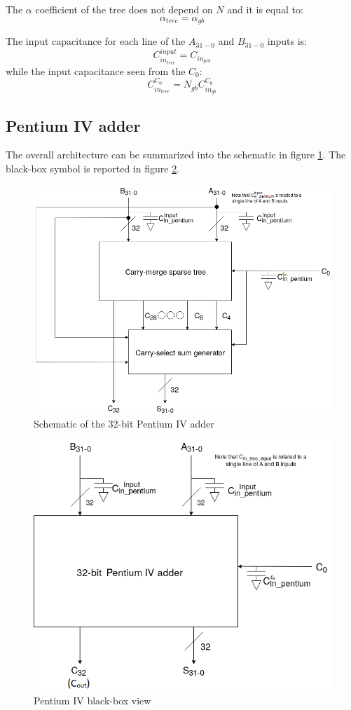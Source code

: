 The $\alpha$ coefficient of the tree does not depend on $N$ and it is equal to:
\begin{equation}
\alpha_{tree} = \alpha_{gb}
\end{equation}

The input capacitance for each line of the $A_{31-0}$ and $B_{31-0}$ inputs is:
\begin{equation}
C_{in_{tree}}^{input} = C_{in_{pcb}}
\end{equation}
while the input capacitance seen from the $C_0$:
\begin{equation}
C_{in_{tree}}^{C_0} = N_{gb}C_{in_{gb}}^{C_0}
\end{equation}





\subsection{Pentium IV adder}
The overall architecture can be summarized into the schematic in figure \ref{fig:pentium32adder_schematic}. The black-box symbol is reported in figure \ref{fig:pentium32adder_bb}.

\begin{figure}[H]
\centering
\includegraphics[width = 10 cm]{pentium/pentium32schematic.png}
\caption{Schematic of the 32-bit Pentium IV adder}
\label{fig:pentium32adder_schematic}
\end{figure}

\begin{figure}[H]
\centering
\includegraphics[width = 8 cm]{pentium/pentium32black_box.png}
\caption{Pentium IV black-box view}
\label{fig:pentium32adder_bb}
\end{figure}

